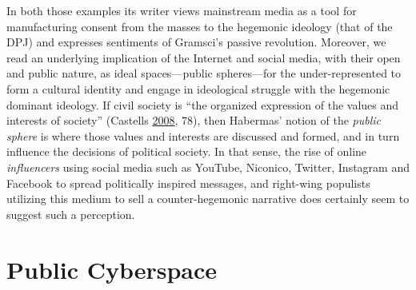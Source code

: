 \documentclass[10pt,british,A4paper,twoside]{memoir}
\begin{document}
In both those examples its writer views mainstream media as a tool for
manufacturing consent from the masses to the hegemonic ideology (that of
the DPJ) and expresses sentiments of Gramsci's passive revolution.
Moreover, we read an underlying implication of the Internet and social
media, with their open and public nature, as ideal spaces—public spheres—for the
under-represented to form a cultural identity and engage in ideological
struggle with the hegemonic dominant ideology. If civil society is ``the
organized expression of the values and interests of society'' (Castells
\protect\hyperlink{ref-castells_new_2008}{2008}, 78), then Habermas'
notion of the \emph{public sphere} is where those values and interests
are discussed and formed, and in turn influence the decisions of
political society. In that sense, the rise of online \emph{influencers} using social
media such as YouTube, Niconico, Twitter, Instagram and Facebook to
spread politically inspired messages, and right-wing populists utilizing
this medium to sell a counter-hegemonic narrative does certainly seem to
suggest such a perception.

\section{Public Cyberspace}\label{public-cyberspace}
\end{document}
